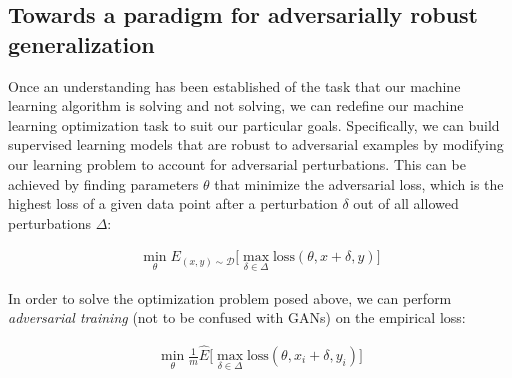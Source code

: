 \documentclass[10pt]{article}
\begin{document}
\subsection{Towards a paradigm for adversarially robust generalization}
Once an understanding has been established of the task that our machine learning algorithm is solving and not solving, we can redefine our machine learning optimization task to suit our particular goals. Specifically, we can build supervised learning models that are robust to adversarial examples by modifying our learning problem to account for adversarial perturbations. This can be achieved by finding parameters $\theta$ that minimize the adversarial loss, which is the highest loss of a given data point after a perturbation $\delta$ out of all allowed perturbations $\Delta$:

\begin{align*}
\min_{\theta} E_{(x,y) \sim \mathcal{D}} \big[\max_{\delta\in\Delta} \text{loss}(\theta, x + \delta, y) \big] 
\end{align*}






In order to solve the optimization problem posed above, we can perform \textit{adversarial training} \cite{Madry2017} (not to be confused with GANs) on the empirical loss:

\begin{align*}
\min_{\theta} \frac{1}{m} \hat{E} \big[\max_{\delta\in\Delta} \text{loss}(\theta, x_i + \delta, y_i) \big] 
\end{align*}

\end{document}
